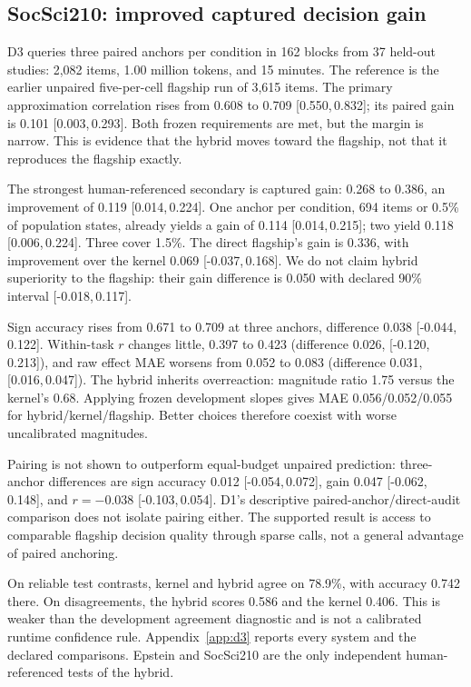 \documentclass[11pt]{article}
\newcommand{\CI}[2]{[#1,\,#2]}
\begin{document}
\subsection{SocSci210: improved captured decision gain}
D3 queries three paired anchors per condition in 162 blocks from 37 held-out studies: 2,082 items, 1.00 million tokens, and 15 minutes. The reference is the earlier unpaired five-per-cell flagship run of 3,615 items. The primary approximation correlation rises from 0.608 to 0.709 \CI{0.550}{0.832}; its paired gain is 0.101 \CI{0.003}{0.293}. Both frozen requirements are met, but the margin is narrow. This is evidence that the hybrid moves toward the flagship, not that it reproduces the flagship exactly.

The strongest human-referenced secondary is captured gain: 0.268 to 0.386, an improvement of 0.119 \CI{0.014}{0.224}. One anchor per condition, 694 items or 0.5\% of population states, already yields a gain of 0.114 \CI{0.014}{0.215}; two yield 0.118 \CI{0.006}{0.224}. Three cover 1.5\%. The direct flagship's gain is 0.336, with improvement over the kernel 0.069 \CI{-0.037}{0.168}. We do not claim hybrid superiority to the flagship: their gain difference is 0.050 with declared 90\% interval \CI{-0.018}{0.117}.

Sign accuracy rises from 0.671 to 0.709 at three anchors, difference 0.038 \CI{-0.044}{0.122}. Within-task $r$ changes little, 0.397 to 0.423 (difference 0.026, \CI{-0.120}{0.213}), and raw effect MAE worsens from 0.052 to 0.083 (difference 0.031, \CI{0.016}{0.047}). The hybrid inherits overreaction: magnitude ratio 1.75 versus the kernel's 0.68. Applying frozen development slopes gives MAE 0.056/0.052/0.055 for hybrid/kernel/flagship. Better choices therefore coexist with worse uncalibrated magnitudes.

Pairing is not shown to outperform equal-budget unpaired prediction: three-anchor differences are sign accuracy 0.012 \CI{-0.054}{0.072}, gain 0.047 \CI{-0.062}{0.148}, and $r=-0.038$ \CI{-0.103}{0.054}. D1's descriptive paired-anchor/direct-audit comparison does not isolate pairing either. The supported result is access to comparable flagship decision quality through sparse calls, not a general advantage of paired anchoring.

On reliable test contrasts, kernel and hybrid agree on 78.9\%, with accuracy 0.742 there. On disagreements, the hybrid scores 0.586 and the kernel 0.406. This is weaker than the development agreement diagnostic and is not a calibrated runtime confidence rule. Appendix~\ref{app:d3} reports every system and the declared comparisons. Epstein and SocSci210 are the only independent human-referenced tests of the hybrid.
\end{document}
